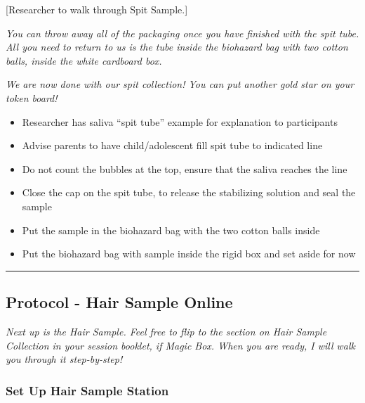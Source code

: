 \documentclass[]{book}
\begin{document}
{[}Researcher to walk through Spit Sample.{]}

\emph{You can throw away all of the packaging once you have finished with the spit tube. All you need to return to us is the tube inside the biohazard bag with two cotton balls, inside the white cardboard box.}

\emph{We are now done with our spit collection! You can put another gold star on your token board!}

\begin{itemize}
\item
  Researcher has saliva ``spit tube'' example for explanation to participants
\item
  Advise parents to have child/adolescent fill spit tube to indicated line
\item
  Do not count the bubbles at the top, ensure that the saliva reaches the line
\item
  Close the cap on the spit tube, to release the stabilizing solution and seal the sample
\item
  Put the sample in the biohazard bag with the two cotton balls inside
\item
  Put the biohazard bag with sample inside the rigid box and set aside for now
\end{itemize}

\begin{center}\rule{0.5\linewidth}{0.5pt}\end{center}

\hypertarget{protocol---hair-sample-online-1}{%
\subsection{Protocol - Hair Sample Online}\label{protocol---hair-sample-online-1}}

\emph{Next up is the Hair Sample. Feel free to flip to the section on Hair Sample Collection in your session booklet, if Magic Box. When you are ready, I will walk you through it step-by-step!}

\hypertarget{set-up-hair-sample-station-2}{%
\subsubsection{Set Up Hair Sample Station}\label{set-up-hair-sample-station-2}}
\end{document}
